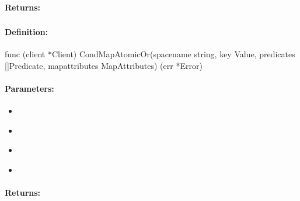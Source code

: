 \paragraph{Returns:}


\pagebreak
\subsubsection{}
\label{api:Go:CondMapAtomicOr}


\paragraph{Definition:}
\begin{gocode}
func (client *Client) CondMapAtomicOr(spacename string, key Value, predicates []Predicate, mapattributes MapAttributes) (err *Error)
\end{gocode}

\paragraph{Parameters:}
\begin{itemize}[noitemsep]
\item {}\\

\item {}\\

\item {}\\

\item {}\\

\end{itemize}

\paragraph{Returns:}


\pagebreak
\subsubsection{}
\label{api:Go:GroupMapAtomicOr}



